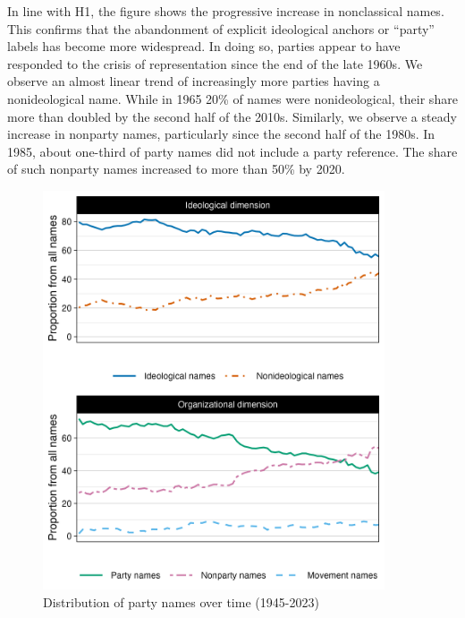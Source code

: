\documentclass[12pt]{article}
\begin{document}
In line with H1, the figure shows the progressive increase in nonclassical names. This confirms that the abandonment of explicit ideological anchors or “party” labels has become more widespread. In doing so, parties appear to have responded to the crisis of representation since the end of the late 1960s. We observe an almost linear trend of increasingly more parties having a nonideological name. While in 1965 20\% of names were nonideological, their share more than doubled by the second half of the 2010s. Similarly, we observe a steady increase in nonparty names, particularly since the second half of the 1980s. In 1985, about one-third of party names did not include a party reference. The share of such nonparty names increased to more than 50\% by 2020.

\begin{figure}[H] \includegraphics[width=0.9\textwidth]{./figures/Figure1.png} \caption{Distribution of party names over time (1945-2023)} \label{Fig:timeline}  \end{figure}
\end{document}
